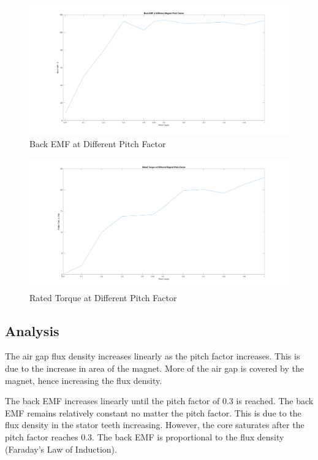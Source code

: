 \documentclass[12pt]{article}
\begin{document}
\begin{figure}[H]
    \centering
    \includegraphics[width=\linewidth]{img/task_9_back_emf.png}
    \caption{Back EMF at Different Pitch Factor}
    \label{fig:task-9-back-emf}
\end{figure}

\begin{figure}[H]
    \centering
    \includegraphics[width=\linewidth]{img/task_9_torque.png}
    \caption{Rated Torque at Different Pitch Factor}
    \label{fig:task-9-torque}
\end{figure}

\subsection{Analysis}

The air gap flux density increases linearly as the pitch factor increases. This is due to the increase in area of the magnet. More of the air gap is covered by the magnet, hence increasing the flux density.

The back EMF increases linearly until the pitch factor of 0.3 is reached. The back EMF remains relatively constant no matter the pitch factor. This is due to the flux density in the stator teeth increasing. However, the core saturates after the pitch factor reaches 0.3. The back EMF is proportional to the flux density (Faraday's Law of Induction).
\end{document}
